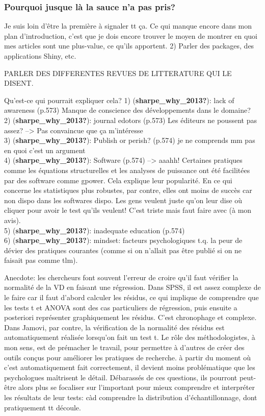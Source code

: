 \documentclass[
  english,
  man]{apa6}
\begin{document}
\hypertarget{pourquoi-jusque-luxe0-la-sauce-na-pas-pris}{%
\subsubsection{Pourquoi jusque là la sauce n'a pas pris?}\label{pourquoi-jusque-luxe0-la-sauce-na-pas-pris}}

Je suis loin d'être la première à signaler tt ça. Ce qui manque encore dans mon plan d'introduction, c'est que je dois encore trouver le moyen de montrer en quoi mes articles sont une plus-value, ce qu'ils apportent.
2) Parler des packages, des applications Shiny, etc.

PARLER DES DIFFERENTES REVUES DE LITTERATURE QUI LE DISENT.

Qu'est-ce qui pourrait expliquer cela?
1) (\textbf{sharpe\_why\_2013?}): lack of awareness (p.573) Manque de conscience des développements dans le domaine?\\
2) (\textbf{sharpe\_why\_2013?}): journal edotors (p.573) Les éditeurs ne poussent pas assez? --\textgreater{} Pas convaincue que ça m'intéresse\\
3) (\textbf{sharpe\_why\_2013?}): Publish or perish? (p.574) je ne comprends mm pas en quoi c'est un argument\\
4) (\textbf{sharpe\_why\_2013?}): Software (p.574) --\textgreater{} aaahh! Certaines pratiques comme les équations structurelles et les analyses de puissance ont été facilitées par des software comme gpower. Cela explique leur popularité. En ce qui concerne les statistiques plus robustes, par contre, elles ont moins de succès car non dispo dans les softwares dispo. Les gens veulent juste qu'on leur dise où cliquer pour avoir le test qu'ils veulent! C'est triste mais faut faire avec (à mon avis).\\
5) (\textbf{sharpe\_why\_2013?}): inadequate education (p.574)\\
6) (\textbf{sharpe\_why\_2013?}): mindset: facteurs psychologiques t.q. la peur de dévier des pratiques courantes (comme si on n'allait pas être publié si on ne faisait pas comme tlm).

Anecdote: les chercheurs font souvent l'erreur de croire qu'il faut vérifier la normalité de la VD en faisant une régression. Dans SPSS, il est assez complexe de le faire car il faut d'abord calculer les résidus, ce qui implique de comprendre que les tests t et ANOVA sont des cas particuliers de régression, puis ensuite a posteriori représenter graphiquement les résidus. C'est chronophage et complexe. Dans Jamovi, par contre, la vérification de la normalité des résidus est automatiquement réalisée lorsqu'on fait un test t. Le rôle des méthodologistes, à mon sens, est de prémacher le travail, pour permettre à d'autres de créer des outils conçus pour améliorer les pratiques de recherche. à partir du moment où c'est automatiquement fait correctement, il devient moins problématique que les psychologues maîtrisent le détail. Débarassés de ces questions, ils pourront peut-être alors plus se focaliser sur l'important pour mieux comprendre et interpréter les résultats de leur tests: càd comprendre la distribution d'échantillonnage, dont pratiquement tt découle.
\end{document}
